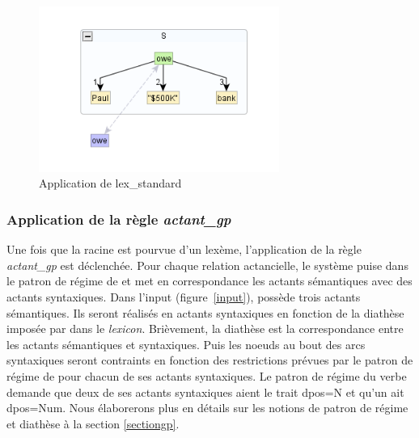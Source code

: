\begin{figure}[htb]
	\centering
	\includegraphics[width=0.7\textwidth, trim = {0cm 0cm 0cm 0cm},clip]{ch3/figs/lex_standard_root.png}
		\vspace{-0.5cm}
	\caption{Application de lex\_standard}
	\label{fig:lexstand1}
\end{figure}

\subsubsection{Application de la règle \emph{actant\_gp}}
Une fois que la racine est pourvue d'un lexème, l'application de la règle \emph{actant\_gp} est déclenchée. Pour chaque relation actancielle, le système puise dans le patron de régime de  et met en correspondance les actants sémantiques avec des actants syntaxiques. Dans l'input (figure~\ref{input}),  possède trois actants sémantiques. Ils seront réalisés en actants syntaxiques en fonction de la diathèse imposée par  dans le \emph{lexicon}. Brièvement, la diathèse est la correspondance entre les actants sémantiques et syntaxiques. Puis les noeuds au bout des arcs syntaxiques seront contraints en fonction des restrictions prévues par le patron de régime de  pour chacun de ses actants syntaxiques. Le patron de régime du verbe demande que deux de ses actants syntaxiques aient le trait dpos=N et qu'un ait dpos=Num. Nous élaborerons plus en détails sur les notions de patron de régime et diathèse à la section \ref{sectiongp}. 

